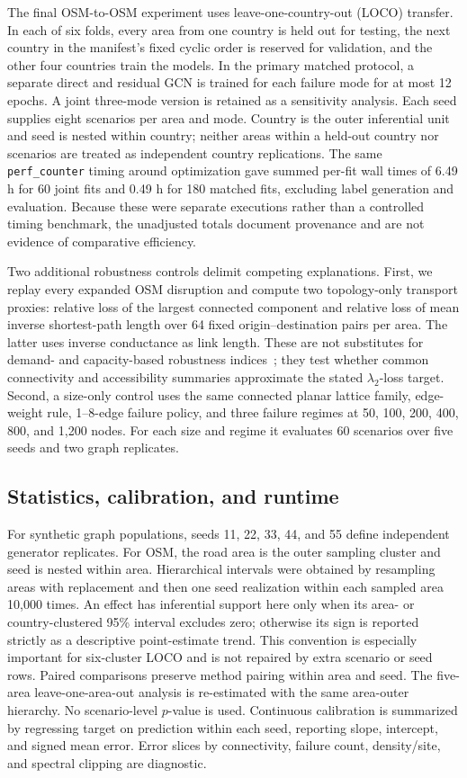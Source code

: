 \documentclass[11pt]{article}
\begin{document}
The final OSM-to-OSM experiment uses leave-one-country-out (LOCO) transfer. In
each of six folds, every area from one country is held out for testing, the next
country in the manifest's fixed cyclic order is reserved for validation, and
the other four countries train the models. In the primary matched protocol, a
separate direct and residual GCN is trained for each failure mode for at most 12
epochs. A joint three-mode version is retained as a sensitivity analysis. Each
seed supplies eight scenarios per area and mode. Country is the outer inferential unit and
seed is nested within country; neither areas within a held-out country nor
scenarios are treated as independent country replications.
The same \texttt{perf\_counter} timing around optimization gave summed per-fit
wall times of 6.49 h for 60 joint fits and 0.49 h for 180 matched fits, excluding
label generation and evaluation. Because these were separate executions rather
than a controlled timing benchmark, the unadjusted totals document provenance
and are not evidence of comparative efficiency.

Two additional robustness controls delimit competing explanations. First, we
replay every expanded OSM disruption and compute two topology-only transport
proxies: relative loss of the largest connected component and relative loss of
mean inverse shortest-path length over 64 fixed origin--destination pairs per
area. The latter uses inverse conductance as link length. These are not substitutes
for demand- and capacity-based robustness indices~\cite{scott2006,sullivan2010};
they test whether common connectivity and accessibility summaries approximate
the stated $\lambda_2$-loss target. Second, a size-only control uses the same
connected planar lattice family, edge-weight rule, 1--8-edge failure policy,
and three failure regimes at 50, 100, 200, 400, 800, and 1,200 nodes. For each
size and regime it evaluates 60 scenarios over five seeds and two graph replicates.

\subsection{Statistics, calibration, and runtime}
For synthetic graph populations, seeds 11, 22, 33, 44, and 55 define independent
generator replicates. For OSM, the road area is the outer sampling cluster and
seed is nested within area. Hierarchical intervals were obtained by resampling
areas with replacement and then one seed realization within each sampled area
10,000 times. An effect has inferential support here only when its area- or
country-clustered 95\% interval excludes zero; otherwise its sign is reported
strictly as a descriptive point-estimate trend. This convention is especially
important for six-cluster LOCO and is not repaired by extra scenario or seed
rows. Paired comparisons preserve method pairing within area and seed. The
five-area leave-one-area-out analysis is re-estimated with the same area-outer
hierarchy. No scenario-level $p$-value is used.
Continuous calibration is summarized by regressing target on prediction within
each seed, reporting slope, intercept, and signed mean error. Error slices by
connectivity, failure count, density/site, and spectral clipping are diagnostic.
\end{document}
